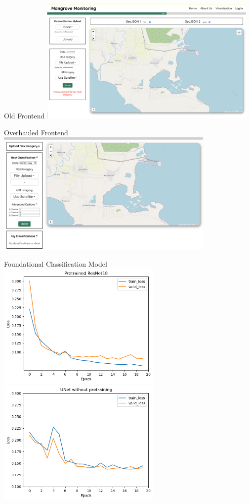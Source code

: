\begin{frame}{Old Frontend}
    \centering
    \includegraphics[height=0.8\textheight,width=0.8\textwidth,keepaspectratio]{images/mm_oldfrontend.png} 
\end{frame}

\begin{frame}{Overhauled Frontend}
    \centering
    \includegraphics[height=0.8\textheight,width=0.8\textwidth,keepaspectratio]{images/mm_frontend.png} 
\end{frame}
\begin{frame}{Foundational Classification Model}
    \centering
    \includegraphics[height=0.6\textheight,width=0.6\textwidth,keepaspectratio]{images/pretrained.png}
    \includegraphics[height=0.6\textheight,width=0.6\textwidth,keepaspectratio]{images/untrained.png}
\end{frame}

